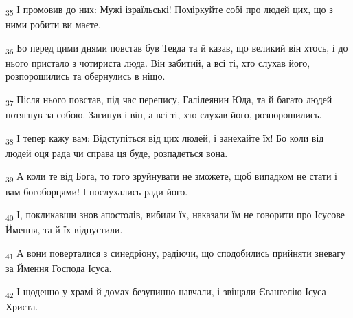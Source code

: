 \begin{tcolorbox}
\textsubscript{35} І промовив до них: Мужі ізраїльські! Поміркуйте собі про людей цих, що з ними робити ви маєте.
\end{tcolorbox}
\begin{tcolorbox}
\textsubscript{36} Бо перед цими днями повстав був Тевда та й казав, що великий він хтось, і до нього пристало з чотириста люда. Він забитий, а всі ті, хто слухав його, розпорошились та обернулись в ніщо.
\end{tcolorbox}
\begin{tcolorbox}
\textsubscript{37} Після нього повстав, під час перепису, Галілеянин Юда, та й багато людей потягнув за собою. Загинув і він, а всі ті, хто слухав його, розпорошились.
\end{tcolorbox}
\begin{tcolorbox}
\textsubscript{38} І тепер кажу вам: Відступіться від цих людей, і занехайте їх! Бо коли від людей оця рада чи справа ця буде, розпадеться вона.
\end{tcolorbox}
\begin{tcolorbox}
\textsubscript{39} А коли те від Бога, то того зруйнувати не зможете, щоб випадком не стати і вам богоборцями! І послухались ради його.
\end{tcolorbox}
\begin{tcolorbox}
\textsubscript{40} І, покликавши знов апостолів, вибили їх, наказали їм не говорити про Ісусове Ймення, та й їх відпустили.
\end{tcolorbox}
\begin{tcolorbox}
\textsubscript{41} А вони поверталися з синедріону, радіючи, що сподобились прийняти зневагу за Ймення Господа Ісуса.
\end{tcolorbox}
\begin{tcolorbox}
\textsubscript{42} І щоденно у храмі й домах безупинно навчали, і звіщали Євангелію Ісуса Христа.
\end{tcolorbox}
